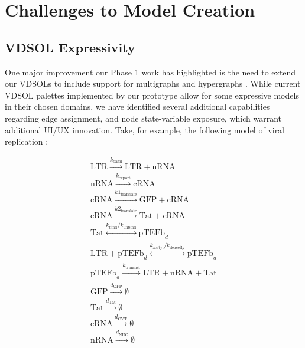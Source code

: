 \documentclass[11pt]{article}
\begin{document}
\section{Challenges to Model Creation}

\subsection{VDSOL Expressivity}

One major improvement our Phase 1 work has highlighted is the need to
extend our VDSOLs to include support for multigraphs and hypergraphs
\cite{balakrishnan2012textbook,berge1984hypergraphs}.  While current
VDSOL palettes implemented by our prototype allow for some expressive
models in their chosen domains, we have identified several additional
capabilities regarding edge assignment, and node state-variable
exposure, which warrant additional UI/UX innovation.  Take, for
example, the following model of viral replication
\cite{srivastava2002stochastic,haseltine2002approximate}:

\begin{eqnarray}
  \mathrm{LTR} \overset{k_{\mathrm{basal}}}{\rightarrow} \mathrm{LTR} + \mathrm{nRNA}\\
  \mathrm{nRNA} \overset{k_{\mathrm{export}}}{\rightarrow} \mathrm{cRNA}\\
  \mathrm{cRNA} \overset{k1_{\mathrm{translate}}}{\rightarrow} \mathrm{GFP} + \mathrm{cRNA}\\
  \mathrm{cRNA} \overset{k2_{\mathrm{translate}}}{\rightarrow} \mathrm{Tat} + \mathrm{cRNA}\\
  \mathrm{Tat}
  \overset{k_{\mathrm{bind}}/k_{\mathrm{unbind}}}{\leftrightarrow} \mathrm{pTEFb}_d\\
  \mathrm{LTR} + \mathrm{pTEFb}_d \overset{k_{\mathrm{acetyl}}/k_{\mathrm{deacetly}}}{\leftrightarrow} \mathrm{pTEFb}_a\\
  \mathrm{pTEFb}_a  \overset{k_{\mathrm{transact}}}{\rightarrow} \mathrm{LTR} + \mathrm{nRNA} + \mathrm{Tat}\\
  \mathrm{GFP} \overset{d_{\mathrm{GFP}}}{\rightarrow} \emptyset\\
  \mathrm{Tat} \overset{d_{\mathrm{Tat}}}{\rightarrow} \emptyset\\
  \mathrm{cRNA} \overset{d_{\mathrm{CYT}}}{\rightarrow} \emptyset\\
  \mathrm{nRNA} \overset{d_{\mathrm{NUC}}}{\rightarrow} \emptyset\\
\end{eqnarray}
\end{document}
